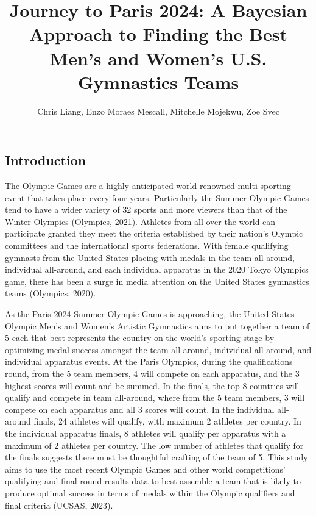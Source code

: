 \documentclass[
  letterpaper,
  DIV=11,
  numbers=noendperiod]{scrartcl}
\title{Journey to Paris 2024: A Bayesian Approach to Finding the Best
Men's and Women's U.S. Gymnastics Teams}
\author{Chris Liang, Enzo Moraes Mescall, Mitchelle Mojekwu, Zoe Svec}
\date{}
\begin{document}
\maketitle
\ifdefined\Shaded\renewenvironment{Shaded}{\begin{tcolorbox}[enhanced, frame hidden, interior hidden, borderline west={3pt}{0pt}{shadecolor}, sharp corners, boxrule=0pt, breakable]}{\end{tcolorbox}}\fi

\hypertarget{introduction}{%
\subsection{Introduction}\label{introduction}}

The Olympic Games are a highly anticipated world-renowned multi-sporting
event that takes place every four years. Particularly the Summer Olympic
Games tend to have a wider variety of 32 sports and more viewers than
that of the Winter Olympics (Olympics, 2021). Athletes from all over the
world can participate granted they meet the criteria established by
their nation's Olympic committees and the international sports
federations. With female qualifying gymnasts from the United States
placing with medals in the team all-around, individual all-around, and
each individual apparatus in the 2020 Tokyo Olympics game, there has
been a surge in media attention on the United States gymnastics teams
(Olympics, 2020).

As the Paris 2024 Summer Olympic Games is approaching, the United States
Olympic Men's and Women's Artistic Gymnastics aims to put together a
team of 5 each that best represents the country on the world's sporting
stage by optimizing medal success amongst the team all-around,
individual all-around, and individual apparatus events. At the Paris
Olympics, during the qualifications round, from the 5 team members, 4
will compete on each apparatus, and the 3 highest scores will count and
be summed. In the finals, the top 8 countries will qualify and compete
in team all-around, where from the 5 team members, 3 will compete on
each apparatus and all 3 scores will count. In the individual all-around
finals, 24 athletes will qualify, with maximum 2 athletes per country.
In the individual apparatus finals, 8 athletes will qualify per
apparatus with a maximum of 2 athletes per country. The low number of
athletes that qualify for the finals suggests there must be thoughtful
crafting of the team of 5. This study aims to use the most recent
Olympic Games and other world competitions' qualifying and final round
results data to best assemble a team that is likely to produce optimal
success in terms of medals within the Olympic qualifiers and final
criteria (UCSAS, 2023).
\end{document}
